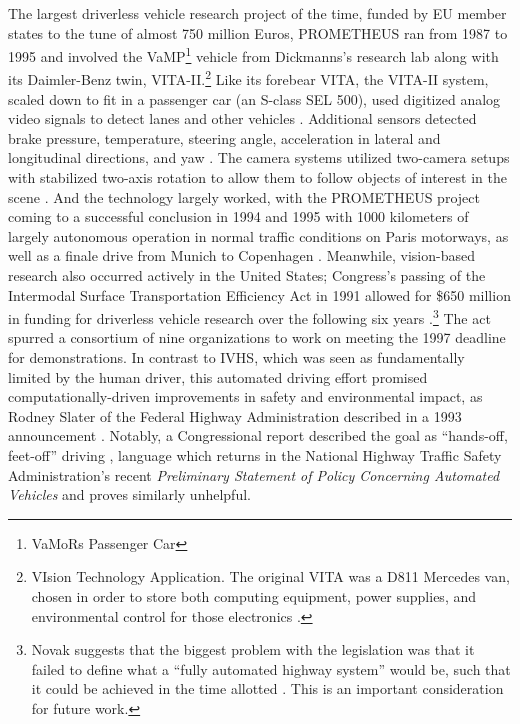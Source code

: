 The largest driverless vehicle 
research project of the time, funded by EU member states to the tune
of almost 750 million Euros, PROMETHEUS ran from 1987 to 1995 and
involved the VaMP\footnote{VaMoRs Passenger Car} vehicle from
Dickmanns's research lab along with its 
Daimler-Benz twin, VITA-II.\footnote{VIsion Technology Application. The original VITA was a
  D811 Mercedes van, chosen in order to store both computing
  equipment, power supplies, and environmental control for those
  electronics \cite[p. 37]{ulmerVITA}.} Like its forebear VITA, the VITA-II
system, scaled down to fit in 
a passenger car (an S-class SEL 500), used digitized analog
video signals to detect lanes and other vehicles \cite[p.
  2]{ulmerVITA-II}. Additional sensors 
detected brake pressure, temperature, steering angle, acceleration in
lateral and longitudinal directions, and yaw \cite[p.
  2]{ulmerVITA-II}. The camera systems
utilized two-camera setups with stabilized two-axis rotation to allow
them to follow objects of interest in the scene \cite{cameraPlatform}. And the
technology largely worked, with the PROMETHEUS project coming to a
successful conclusion in 1994 and 1995 with 1000 kilometers of largely
autonomous operation in normal traffic conditions on Paris motorways,
as well as a finale drive from Munich to Copenhagen \cite{makingBertha}.
Meanwhile, vision-based research also occurred actively in the United States;
Congress's passing of the Intermodal 
Surface Transportation Efficiency Act in 1991 allowed for \$650 million
in funding for driverless vehicle research over the following six
years
\cite{novakAlmost}.\footnote{Novak suggests that the biggest problem with
the legislation was that it failed to define what a ``fully automated
highway system'' would be, such that it could be achieved in the time
allotted \cite{novakAlmost}. This is an important consideration for
future work.} The act spurred a consortium of nine organizations to
work on meeting the 1997 deadline for demonstrations. In contrast to
IVHS, which was seen as fundamentally limited by the human driver,
this automated driving effort promised computationally-driven
improvements in safety and environmental impact, as Rodney Slater of
the Federal Highway Administration described in a 1993 announcement
\cite[p. 30]{wetmore}.
Notably, a Congressional report described the goal as ``hands-off,
feet-off'' driving \cite{novakAlmost}, language which returns in the
National Highway Traffic Safety Administration's recent
\emph{Preliminary Statement of Policy Concerning Automated Vehicles}
and proves similarly unhelpful.

